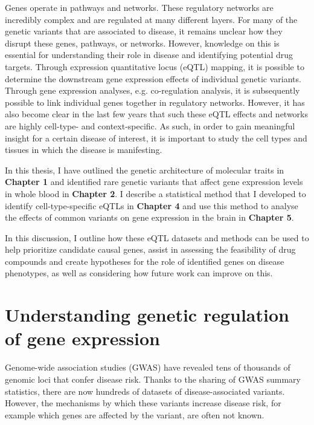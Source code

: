 Genes operate in pathways and networks. These regulatory networks are incredibly complex and are regulated at many different layers. For many of the genetic variants that are associated to disease, it remains unclear how they disrupt these genes, pathways, or networks. However, knowledge on this is essential for understanding their role in disease and identifying potential drug targets. Through expression quantitative locus (eQTL) mapping, it is possible to determine the downstream gene expression effects of individual genetic variants. Through gene expression analyses, e.g. co-regulation analysis, it is subsequently possible to link individual genes together in regulatory networks. However, it has also become clear in the last few years that such these eQTL effects and networks are highly cell-type- and context-specific. As such, in order to gain meaningful insight for a certain disease of interest, it is important to study the cell types and tissues in which the disease is manifesting.


In this thesis, I have outlined the genetic architecture of molecular traits in \textbf{Chapter 1}\cite{claringbouldGeneticArchitectureMolecular2017} and identified rare genetic variants that affect gene expression levels in whole blood in \textbf{Chapter 2}\cite{kleinImbalancedExpressionPredicted2020}. I describe a statistical method that I developed to identify cell-type-specific eQTLs in \textbf{Chapter 4}\cite{raulaguirregamboaDeconvolutionBulkBlood2020} and use this method to analyse the effects of common variants on gene expression in the brain in \textbf{Chapter 5}.


In this discussion, I outline how these eQTL datasets and methods can be used to help prioritize candidate causal genes, assist in assessing the feasibility of drug compounds and create hypotheses for the role of identified genes on disease phenotypes, as well as considering how future work can improve on this.


\section{Understanding genetic regulation of gene expression}

Genome-wide association studies (GWAS) have revealed tens of thousands of genomic loci that confer disease risk. Thanks to the sharing of GWAS summary statistics, there are now hundreds of datasets of disease-associated variants\cite{visscher10YearsGWAS2017}. However, the mechanisms by which these variants increase disease risk, for example which genes are affected by the variant, are often not known.


